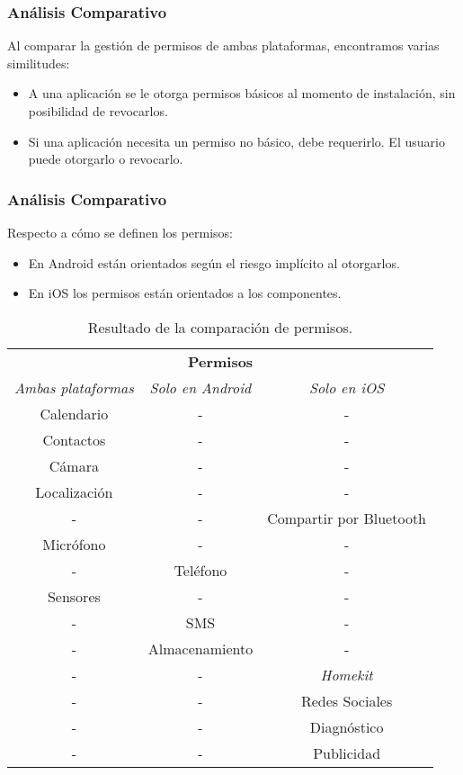 \begin{frame}
 \frametitle{Análisis Comparativo}
Al comparar la gestión de permisos de ambas plataformas, encontramos varias similitudes:\pause
 \begin{itemize}[<+->]
  \item A una aplicación se le otorga permisos básicos al momento de instalación, sin posibilidad de revocarlos.
  \item Si una aplicación necesita un permiso no básico, debe requerirlo. El usuario puede otorgarlo o revocarlo.
 \end{itemize}
\end{frame}
\begin{frame}
 \frametitle{Análisis Comparativo}
Respecto a cómo se definen los permisos: \pause
 \begin{itemize}[<+->]
  \item En Android están orientados según el riesgo implícito al otorgarlos.
  \item En iOS los permisos están orientados a los componentes.
 \end{itemize} \pause
 \begin{tiny}
  \begin{table}[H]
    \centering
	\begin{tabular}{c c c}
		\hline
		\multicolumn{3}{c}{\textbf{Permisos}} \\
		\emph{Ambas plataformas} 	& \emph{Solo en Android}	& \emph{Solo en iOS} \\ \hline    \hline
		Calendario	& -		& -	\\						
		Contactos	& -				& - \\						
		Cámara		& -				& -	\\						
		Localización& -				& -	\\						
		-			& -				& Compartir por Bluetooth\\ 
		Micrófono   & -				& - \\						
		-			& Teléfono		& -	\\						
		Sensores    & -    			& - \\						
		-			& SMS			& - \\						
		-			& Almacenamiento& - \\						
		-			& -				& \emph{Homekit} \\			
		-			& -				& Redes Sociales \\        	
		-			& -				& Diagnóstico \\        			
		-			& -				& Publicidad \\    			\hline
	\end{tabular}
	\caption{Resultado de la comparación de permisos.}
   \end{table}
   	\end{tiny}
\end{frame}

